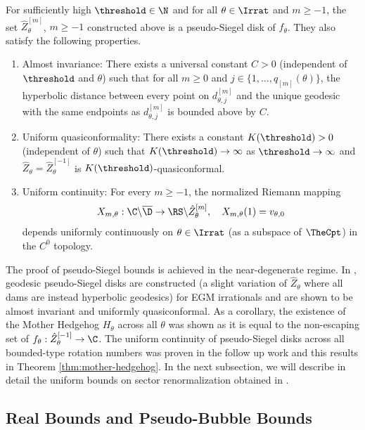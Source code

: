 \documentclass{amsart}
\begin{document}
\begin{theorem}
\label{thm:pseudo-siegel}
    For sufficiently high $\threshold \in \N$ and for all $\theta \in \Irrat$ and $m \geq -1$, the set $\hat{Z}_{\theta}^{[m]}$, $m \geq -1$ constructed above is a pseudo-Siegel disk of $f_\theta$. 
    They also satisfy the following properties.
    \begin{enumerate}
        \item Almost invariance: There exists a universal constant $C>0$ (independent of $\threshold$ and $\theta$) such that for all $m \geq 0$ and $j \in \{1,\ldots, q_{[m]}(\theta)\}$, the hyperbolic distance between every point on $d^{[m]}_{\theta,j}$ and the unique geodesic with the same endpoints as $d^{[m]}_{\theta,j}$ is bounded above by $C$.
        \item Uniform quasiconformality: There exists a constant $ K(\threshold)>0$ (independent of $\theta$) such that $K(\threshold) \to \infty$ as $\threshold \to \infty$ and $\hat{Z}_{\theta} = \hat{Z}_{\theta}^{[-1]}$ is $K(\threshold)$-quasiconformal.
        \item Uniform continuity: For every $m \geq -1$, the normalized Riemann mapping 
        \[
            X_{m,\theta}: \C \backslash \overline{\D} \to \RS \backslash \hat{Z}_{\theta}^{[m]}, \quad X_{m,\theta}(1) = v_{\theta,0}
        \]
        depends uniformly continuously on $\theta \in \Irrat$ (as a subspace of $\TheCpt$) in the $C^0$ topology. 
    \end{enumerate}
\end{theorem}

The proof of pseudo-Siegel bounds is achieved in the near-degenerate regime. 
In \cite{DLy22}, geodesic pseudo-Siegel disks are constructed (a slight variation of $\hat{Z}_{\theta}$ where all dams are instead hyperbolic geodesics) for EGM irrationals and are shown to be almost invariant and uniformly quasiconformal. 
As a corollary, the existence of the Mother Hedgehog $H_{\theta}$ across all $\theta$ was shown as it is equal to the non-escaping set of $f_{\theta}: \hat{Z}_{\theta}^{[-1]} \to \C$. 
The uniform continuity of pseudo-Siegel disks across all bounded-type rotation numbers was proven in the follow up work \cite{DLy26a} and this results in Theorem \ref{thm:mother-hedgehog}. 
In the next subsection, we will describe in detail the uniform bounds on sector renormalization obtained in \cite{DLy26a}.

\subsection{Real Bounds and Pseudo-Bubble Bounds}
\label{ss:real-bubble-bounds}
\end{document}

